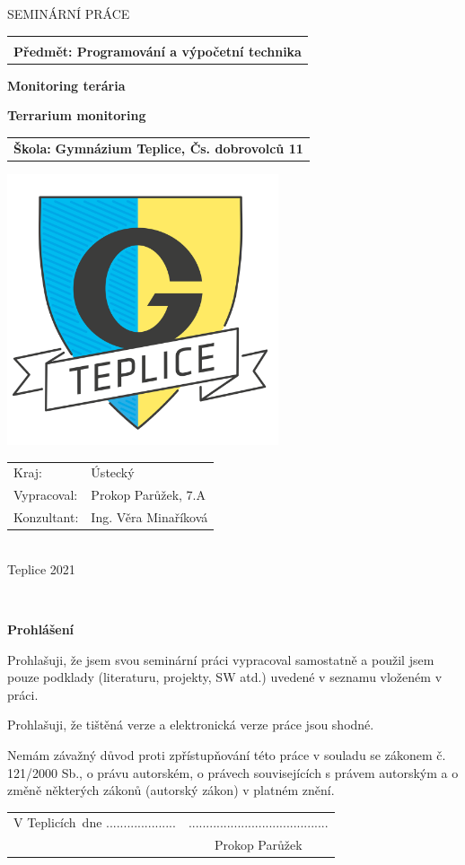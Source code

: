 \documentclass[a4paper,twoside,12pt]{book}
\newcommand{\tb}{\textbf} %
\newcommand{\cvut}{Gymnázium Teplice, Čs. dobrovolců 11}
\newcommand{\ksi}{}
\newcommand{\obor}{Programování a výpočetní technika} %
\newcommand{\druh}{Seminární práce} %
\newcommand{\woman}{} %
\newcommand{\logoCVUT}{\includegraphics[height=8cm]{gympl}}  %
\newcommand{\nazevcz}{Monitoring terária}	%
\newcommand{\nazeven}{Terrarium monitoring}	%
\newcommand{\autor}{Prokop Parůžek}   %
\newcommand{\trida}{7.A} %
\newcommand{\vedouci}{Ing. Věra Minaříková} %
\newcommand{\kde}{Teplicích} %
\newcommand{\prohlaseni}{Prohlašuji, že jsem svou seminární práci vypracoval\woman{} samostatně a použil\woman{} jsem pouze podklady (literaturu, projekty, SW atd.) uvedené v seznamu vloženém v práci. 

Prohlašuji, že tištěná verze a elektronická verze práce jsou shodné. 

Nemám závažný důvod proti zpřístupňování této práce v souladu se zákonem č. 121/2000 Sb., o právu autorském, o právech souvisejících s právem autorským a o změně některých zákonů (autorský zákon) v platném znění. } %
\begin{document}
\thispagestyle{empty}

\begin{center}
   {\Large \MakeUppercase{\druh}}
	\vspace{5mm}

	\begin{tabular}{c}
		\tb{\ksi} \\[3pt]   \tb{Předmět: \obor}\\
	\end{tabular}

	\vspace{10mm}
   {\huge \tb{\nazevcz}\par}
   \vspace{5mm}   {\huge \tb{\nazeven}\par}
   
   \vspace{10mm}
	 \begin{tabular}{c}
			 \LARGE{\tb{Škola:} \tb{\cvut}}
	\end{tabular}

   \vspace{10mm} \logoCVUT \vspace{15mm} 

   \vfill
   {\large
	\begin{tabular}{ll}
	Kraj: & Ústecký\\
	Vypracoval: & \autor, \trida\\
	Konzultant: & \vedouci\\
	\end{tabular}
	 }\\
\vspace{1cm}
\LARGE{Teplice 2021}
\end{center}

\clearpage{\pagestyle{empty}\cleardoublepage} %

\newpage %
\thispagestyle{empty}  %

~ %
\vfill %

\tb{Prohlášení} %

\vspace{1em} %
\prohlaseni

\vspace{2em}  %
\hspace{-0.5em}\begin{tabularx}{\textwidth}{X c}  %
V \kde\ dne .................... &........................................ \\	%
	& \autor
\end{tabularx}	%
\end{document}

